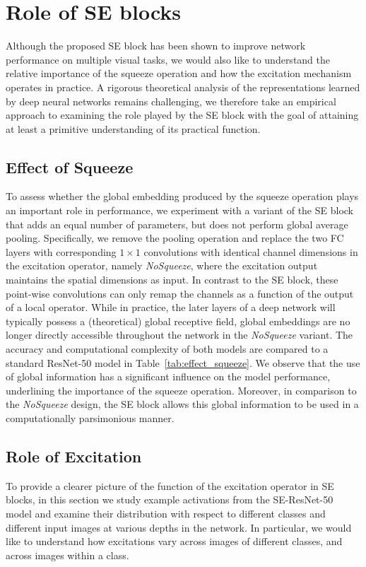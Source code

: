 \section{Role of SE blocks} \label{sec:interpretation}

Although the proposed SE block has been shown to improve network performance on multiple visual tasks, we would also like to understand the relative importance of the squeeze operation and how the excitation mechanism operates in practice. A rigorous theoretical analysis of the representations learned by deep neural networks remains challenging, we therefore take an empirical approach to examining the role played by the SE block with the goal of attaining at least a primitive understanding of its practical function.



\subsection{Effect of Squeeze}\label{subsection:effect-of-squeeze}
To assess whether the global embedding produced by the squeeze operation plays an important role in performance, we experiment with a variant of the SE block that adds an equal number of parameters, but does not perform global average pooling. Specifically, we remove the pooling operation and replace the two FC layers with corresponding $1\times 1$ convolutions with identical channel dimensions in the excitation operator, namely \textit{NoSqueeze}, where the excitation output maintains the spatial dimensions as input. In contrast to the SE block, these point-wise convolutions can only remap the channels as a function of the output of a local operator. While in practice, the later layers of a deep network will typically possess a (theoretical) global receptive field, global embeddings are no longer directly accessible throughout the network in the \textit{NoSqueeze} variant. The accuracy and computational complexity of both models are compared to a standard ResNet-50 model in Table~\ref{tab:effect_squeeze}. We observe that the use of global information has a significant influence on the model performance, underlining the importance of the squeeze operation.  Moreover, in comparison to the \textit{NoSqueeze} design, the SE block allows this global information to be used in a computationally parsimonious manner.

\subsection{Role of Excitation} \label{subsection:role-of-excitation}
To provide a clearer picture of the function of the excitation operator in SE blocks, in this section we study example activations from the SE-ResNet-50 model and examine their distribution with respect to different classes and different input images at various depths in the network.  In particular, we would like to understand how excitations vary across images of different classes, and across images within a class.

